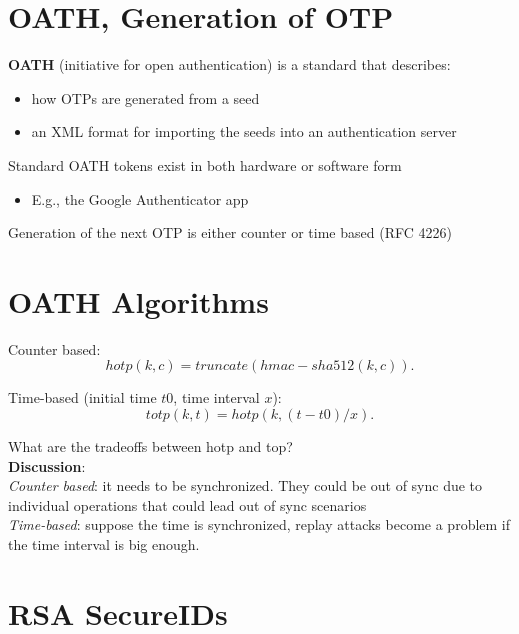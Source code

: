 \documentclass[11pt]{article}
\begin{document}
\section*{OATH, Generation of OTP}

\textbf{OATH} (initiative for open authentication)  is a standard that describes:
\begin{itemize}
	\item how OTPs are generated from a seed
	\item an XML format for importing the seeds into an authentication server
\end{itemize}

Standard OATH tokens exist in both hardware or software form
\begin{itemize}
	\item E.g., the Google Authenticator app
\end{itemize}

Generation of the next OTP is either counter or time based (RFC 4226)

\section*{OATH Algorithms}

Counter based: 
\[
hotp(k, c) = truncate(hmac-sha512(k,c))
.\] 

Time-based (initial time $t0$, time interval  $x$):
 \[
totp(k, t) = hotp(k, (t - t0)/x)
.\] 


\begin{tcolorbox}[
  colback=orange!15,     %
  colframe=black!50,    %
  boxrule=1pt,       %
  arc=3mm,             %
  left=4mm, right=4mm, top=2mm, bottom=2mm %
]
What are the tradeoffs between hotp and top? \\

\textbf{Discussion}: \\

\textit{Counter based}: it needs to be synchronized. They could be out of sync due to individual operations that could lead out of sync scenarios \\

\textit{Time-based}: suppose the time is synchronized, replay attacks become a problem if the time interval is big enough. 
\end{tcolorbox}

\section*{RSA SecureIDs}
\end{document}
